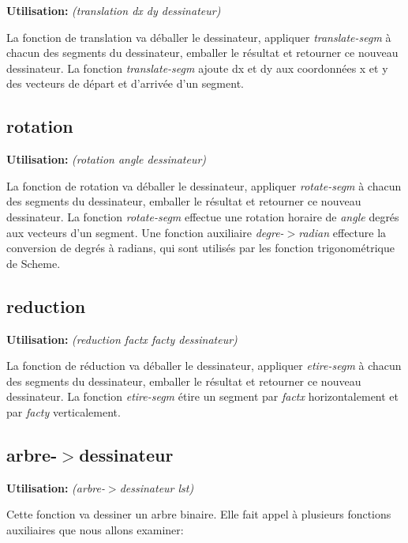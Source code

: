 \documentclass[10pt]{report}
\newcommand{\usage}[1]{\textbf{Utilisation: }\emph{#1}}
\begin{document}
\usage{(translation dx dy dessinateur)}

La fonction de translation va déballer le dessinateur, appliquer
\emph{translate-segm} à chacun des segments du dessinateur, emballer
le résultat et retourner ce nouveau dessinateur.  La fonction
\emph{translate-segm} ajoute dx et dy aux coordonnées x et y des
vecteurs de départ et d'arrivée d'un segment.


\subsection{rotation}

\usage{(rotation angle dessinateur)}

La fonction de rotation va déballer le dessinateur, appliquer
\emph{rotate-segm} à chacun des segments du dessinateur, emballer le
résultat et retourner ce nouveau dessinateur.  La fonction
\emph{rotate-segm} effectue une rotation horaire de \emph{angle}
degrés aux vecteurs d'un segment.  Une fonction auxiliaire
\emph{degre-$>$radian} effecture la conversion de degrés à radians,
qui sont utilisés par les fonction trigonométrique de Scheme.

\subsection{reduction}

\usage{(reduction factx facty dessinateur)}

La fonction de réduction va déballer le dessinateur, appliquer
\emph{etire-segm} à chacun des segments du dessinateur, emballer le
résultat et retourner ce nouveau dessinateur.  La fonction
\emph{etire-segm} étire un segment par \emph{factx} horizontalement et
par \emph{facty} verticalement.



\subsection{arbre-$>$dessinateur}

\usage{(arbre-$>$dessinateur lst)}

Cette fonction va dessiner un arbre binaire.  Elle fait appel à
plusieurs fonctions auxiliaires que nous allons examiner:
\end{document}
